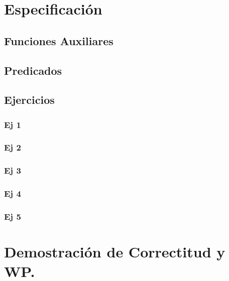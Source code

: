 \documentclass[10pt,a4paper]{article}
\begin{document}
\maketitle

\section{Especificación}

\subsection{Funciones Auxiliares}


\subsection{Predicados}


\subsection{Ejercicios}

\subsubsection{Ej 1}
 

\subsubsection{Ej 2}


\subsubsection{Ej 3}


\subsubsection{Ej 4}


\subsubsection{Ej 5}


\newpage

\section{Demostraci\'on de Correctitud y WP.}

\end{document}
